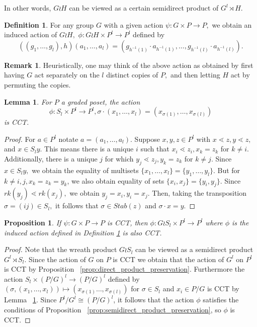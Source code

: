 \documentclass[10 pt]{amsart}
\theoremstyle{plain}
\newtheorem{prop}[thm]{Proposition}
\newtheorem{lem}[thm]{Lemma}
\theoremstyle{definition}
\newtheorem{defn}[thm]{Definition}
\newtheorem{rem}[thm]{Remark}
\theoremstyle{remark}
\numberwithin{equation}{section}
\begin{document}
In other words, $G\wr H$ can be viewed as a certain semidirect product of $G^l \rtimes H.$

\begin{defn}
\label{defn:wreath_action}
For any group $G$ with a given action $\psi:G\times P \rightarrow P,$ we obtain an induced action of $G \wr H,$ $\phi:G \wr H \times P^l \rightarrow P^l$ defined by 
$$((g_1,\ldots, g_l),h)(a_1,\ldots, a_l) = (g_{h^{-1}(1)}\cdot a_{h^{-1}(1)},\ldots,g_{h^{-1}(l)} \cdot a_{h^{-1}(l)}).$$
\end{defn}

\begin{rem}
Heuristically, one may think of the above action as obtained by first having $G$ act separately on the $l$ distinct copies of $P,$ and then letting $H$ act by permuting the copies.
\end{rem}

\begin{lem}
\label{lem:symmetric_group_product_action}
For $P$ a graded poset, the action 
$$\phi:S_l \times P^l \rightarrow P^l,\sigma \cdot(x_1,\ldots, x_l) = (x_{\sigma(1)},\ldots, x_{\sigma(l)})$$
is CCT.
\end{lem}
\begin{proof}
For $a \in P^l$ notate $a = (a_1,\ldots, a_l).$ Suppose $x,y,z \in P^l$ with $x\lessdot z,y\lessdot z,$ and $x \in S_ly.$ This means there is a unique $i$ such that $x_i \lessdot z_i,x_k = z_k$ for $k \neq i.$ Additionally, there is a unique $j$ for which $y_j \lessdot z_j,y_k =z_k$ for $k \neq j.$ Since $x \in S_ly,$ we obtain the equality of multisets $\{x_1,\ldots, x_l\}=\{y_1,\ldots,y_l\}.$ But for $k \neq i,j,x_k = z_k = y_k$, we also obtain equality of sets $\{x_i,x_j\} = \{y_i,y_j\}.$ Since $rk(y_j) \lessdot rk(x_j),$ we obtain $y_j = x_i,y_i = x_j.$ Then, taking the transposition $\sigma  = (ij) \in S_l,$ it follows that $\sigma \in Stab(z)$ and $\sigma \cdot x = y.$
\end{proof}

\begin{prop}
\label{prop:wreath_preservation}
If $\psi:G\times P \rightarrow P$ is CCT, then $\phi:G\wr S_l \times P^l \rightarrow P^l$ where $\phi$ is the induced action defined in Definition \ref{defn:wreath_action} is also CCT.
\end{prop}
\begin{proof}
Note that the wreath product $G \wr S_l$ can be viewed as a semidirect product $G^l \rtimes S_l$. Since the action of $G$ on $P$ is CCT we obtain that the action of $G^l$ on $P^l$ is CCT by Proposition ~\ref{prop:direct_product_preservation}.  Furthermore the action $S_l \times (P/G)^l \rightarrow (P/G)^l$ defined by $(\sigma ,(x_1,\ldots, x_l)) \mapsto (x_{\sigma(1)}\ldots, x_{\sigma(l)})$ for $\sigma \in S_l$ and $x_i \in P/G$ is CCT by Lemma ~\ref{lem:symmetric_group_product_action}.  Since $P^l/G^l \cong (P/G)^l$, it follows that the action $\phi$ satisfies the conditions of Proposition ~\ref{prop:semidirect_product_preservation}, so $\phi$ is CCT.
\end{proof}
\end{document}
